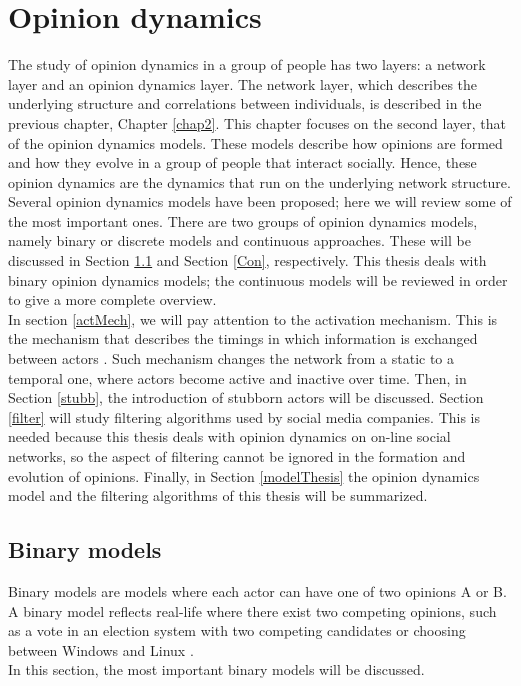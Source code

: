 \documentclass[11 pt , letterpaper , twoside , openright]{book}
\begin{document}
\chapter{Opinion dynamics}
\label{chap3}
The study of opinion dynamics in a group of people has two layers: a network layer and an opinion dynamics layer. The network layer, which describes the underlying structure and correlations between individuals, is described in the previous chapter, Chapter \ref{chap2}. This chapter focuses on the second layer, that of the opinion dynamics models. These models describe how opinions are formed and how they evolve in a group of people that interact socially. Hence, these opinion dynamics are the dynamics that run on the underlying network structure.\\
\newline
Several opinion dynamics models have been proposed; here we will review some of the most important ones. There are two groups of opinion dynamics models, namely binary or discrete models and continuous approaches. These will be discussed in Section \ref{Bin} and Section \ref{Con}, respectively. This thesis deals with binary opinion dynamics models; the continuous models will be reviewed in order to give a more complete overview.\\
\newline
In section \ref{actMech}, we will pay attention to the activation mechanism. This is the mechanism that describes the timings in which information is exchanged between actors \cite{Perra2019}. Such mechanism changes the network from a static to a temporal one, where actors become active and inactive over time. Then, in Section \ref{stubb}, the introduction of stubborn actors will be discussed. Section \ref{filter} will study filtering algorithms used by social media companies. This is needed because this thesis deals with opinion dynamics on on-line social networks, so the aspect of filtering cannot be ignored in the formation and evolution of opinions. Finally, in Section \ref{modelThesis} the opinion dynamics model and the filtering algorithms of this thesis will be summarized.

\section{Binary models}\label{Bin}

Binary models are models where each actor can have one of two opinions A or B. A binary model reflects real-life where there exist two competing opinions, such as a vote in an election system with two competing candidates or choosing between Windows and Linux \cite{Nguyen2020}.\\
\newline
In this section, the most important binary models will be discussed.
\end{document}
